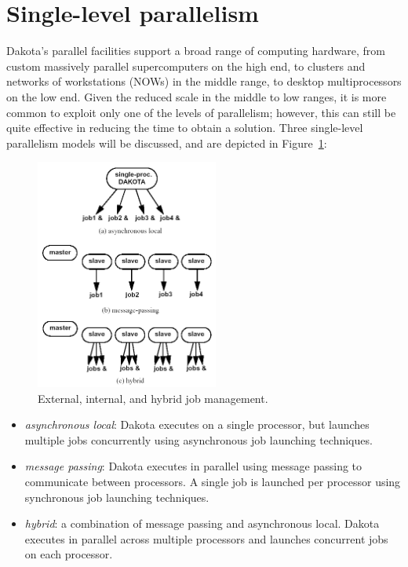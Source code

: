 \section{Single-level parallelism} \label{parallel:SLP}


Dakota's parallel facilities support a broad range of computing
hardware, from custom massively parallel supercomputers on the high
end, to clusters and networks of workstations (NOWs) in the middle
range, to desktop multiprocessors on the low end. Given the reduced
scale in the middle to low ranges, it is more common to exploit only
one of the levels of parallelism; however, this can still be quite
effective in reducing the time to obtain a solution.  Three
single-level parallelism models will be discussed, and are depicted
in Figure~\ref{parallel:figure03}:

\begin{figure}[ht]
  \centering
  \includegraphics[width=60mm]{images/ex_in_hy_job_management}
  \caption{External, internal, and hybrid job management.}
  \label{parallel:figure03}
\end{figure}

\begin{itemize}
\item \emph{asynchronous local}: Dakota executes on a single processor,
but launches multiple jobs concurrently using asynchronous job launching
techniques.

\item \emph{message passing}: Dakota executes in parallel using message
passing to communicate between processors.  A single job is launched
per processor using synchronous job launching techniques.

\item \emph{hybrid}: a combination of message passing and asynchronous
local.  Dakota executes in parallel across multiple processors and
launches concurrent jobs on each processor.
\end{itemize}

